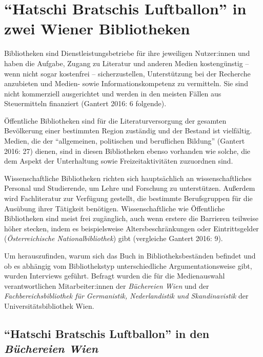 \documentclass[a4paper,
fontsize=11pt,
oneside,
numbers=noperiodatend,
parskip=half-,
bibliography=totoc,
final
]{scrartcl}
\begin{document}
\hypertarget{hatschi-bratschis-luftballon-in-zwei-wiener-bibliotheken}{%
\section{\enquote{Hatschi Bratschis Luftballon} in zwei Wiener
Bibliotheken}\label{hatschi-bratschis-luftballon-in-zwei-wiener-bibliotheken}}

Bibliotheken sind Dienstleistungsbetriebe für ihre jeweiligen
Nutzer:innen und haben die Aufgabe, Zugang zu Literatur und anderen
Medien kostengünstig -- wenn nicht sogar kostenfrei -- sicherzustellen,
Unterstützung bei der Recherche anzubieten und Medien- sowie
Informationskompetenz zu vermitteln. Sie sind nicht kommerziell
ausgerichtet und werden in den meisten Fällen aus Steuermitteln
finanziert (Gantert 2016: 6 folgende).

Öffentliche Bibliotheken sind für die Literaturversorgung der gesamten
Bevölkerung einer bestimmten Region zuständig und der Bestand ist
vielfältig. Medien, die der \enquote{allgemeinen, politischen und beruflichen
Bildung} (Gantert 2016: 27) dienen, sind in diesen Bibliotheken ebenso
vorhanden wie solche, die dem Aspekt der Unterhaltung sowie
Freizeitaktivitäten zuzuordnen sind.

Wissenschaftliche Bibliotheken richten sich hauptsächlich an
wissenschaftliches Personal und Studierende, um Lehre und Forschung zu
unterstützen. Außerdem wird Fachliteratur zur Verfügung gestellt, die
bestimmte Berufsgruppen für die Ausübung ihrer Tätigkeit benötigen.
Wissenschaftliche wie Öffentliche Bibliotheken sind meist frei
zugänglich, auch wenn erstere die Barrieren teilweise höher stecken,
indem es beispielsweise Altersbeschränkungen oder Eintrittsgelder
(\emph{Österreichische Nationalbibliothek}) gibt (vergleiche Gantert
2016: 9).

Um herauszufinden, warum sich das Buch in Bibliotheksbeständen befindet
und ob es abhängig vom Bibliothekstyp unterschiedliche
Argumentationsweise gibt, wurden Interviews geführt. Befragt wurden die
für die Medienauswahl verantwortlichen Mitarbeiter:innen der
\emph{Büchereien Wien} und der \emph{Fachbereichsbibliothek für
Germanistik, Nederlandistik und Skandinavistik} der
Universitätsbibliothek Wien.

\hypertarget{hatschi-bratschis-luftballon-in-den-buxfcchereien-wien}{%
\subsection{\texorpdfstring{\enquote{Hatschi Bratschis Luftballon} in den
\emph{Büchereien
Wien}}{\enquote{Hatschi Bratschis Luftballon} in den Büchereien Wien}}\label{hatschi-bratschis-luftballon-in-den-buxfcchereien-wien}}
\end{document}
